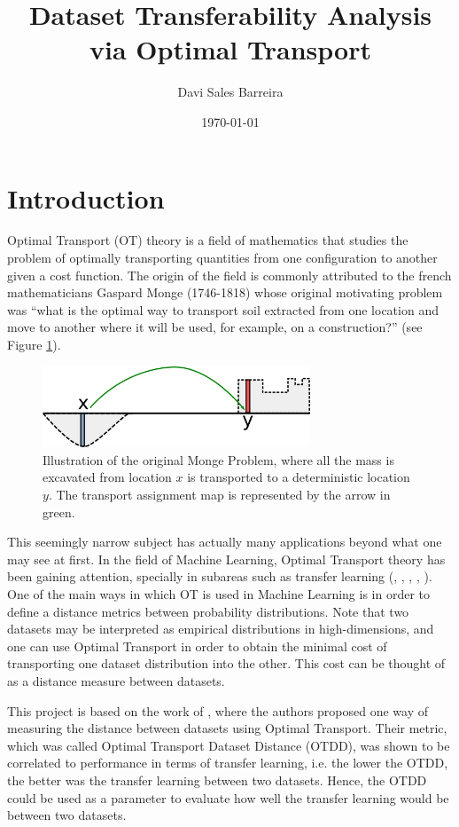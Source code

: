 \documentclass[10pt]{article}
\title{Dataset Transferability Analysis via Optimal Transport}
\author{Davi Sales Barreira}
\date{\today}
\theoremstyle{definition}
\begin{document}
\maketitle

\section{Introduction}

Optimal Transport (OT) theory is a field of mathematics that studies the problem of optimally transporting
quantities from one configuration to another given a cost function.
The origin of the field is commonly attributed to the french mathematicians Gaspard Monge (1746-1818)
whose original motivating problem was
``what is the optimal way to transport soil extracted
from one location and move to another where it will be used,
for example, on a construction?'' (see Figure \ref{fig:mongeproblem}).

\begin{figure}[H]
  \centering
  \includegraphics[width=8cm]{Figures/mongeproblem.png}
  \caption{Illustration of the original Monge Problem, where all the mass is excavated from location
  $x$ is transported to a deterministic location $y$. The transport assignment map is represented by the arrow in green.}
  \label{fig:mongeproblem}
\end{figure}

This seemingly narrow subject has actually many applications beyond what one may see at first.
In the field of Machine Learning, Optimal Transport theory has been gaining attention, specially
in subareas such as transfer learning
(\citep{flamary2014optimal}, \citep{courty2014domain},
\citep{damodaran2018deepjdot}, \citep{solomon2014wasserstein},
\citep{shen2018wasserstein}).
One of the main ways in which OT is used in Machine Learning is in order to define
a distance metrics between probability distributions. Note that
two datasets may be interpreted as empirical distributions
in high-dimensions, and one can use Optimal Transport in order to obtain the minimal cost
of transporting one dataset distribution into the other. This cost can be thought of
as a distance measure between datasets.

This project is based on the work of \citet{alvarez2020geometric}, where the
authors proposed one way of measuring the distance between datasets using
Optimal Transport. Their metric, which was called Optimal Transport
Dataset Distance (OTDD), was shown to be correlated to performance in terms of
transfer learning, i.e. the lower the OTDD, the better was the transfer learning
between two datasets. Hence, the OTDD could be
used as a parameter to evaluate how well the transfer learning would be
between two datasets.
\end{document}
